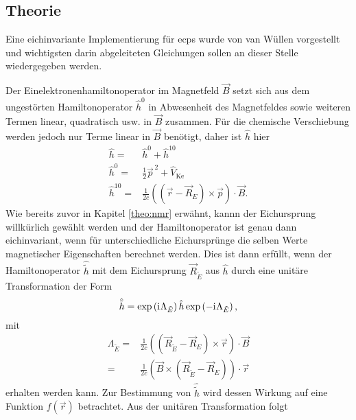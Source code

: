 	\subsection{Theorie}
	Eine eichinvariante Implementierung für \acp{ecp} wurde von van Wüllen\supercite{van2012use} vorgestellt und wichtigsten darin abgeleiteten Gleichungen sollen an dieser Stelle wiedergegeben werden. 
	
	Der Einelektronenhamiltonoperator im Magnetfeld $\vec{B}$ setzt sich aus dem ungestörten Hamiltonoperator $\hat{h}^0$ in Abwesenheit des Magnetfeldes sowie weiteren Termen linear, quadratisch usw. in $\vec{B}$ zusammen. Für die chemische Verschiebung werden jedoch nur Terme linear in $\vec{B}$ benötigt, daher ist $\hat{h}$ hier
	\begin{equation}\label{eq:heinel}
	\begin{aligned}
	\hat{h}=&\hat{h}^0+\hat{h}^{10}\\
	\hat{h}^0=&\frac{1}{2}\vec{p}^{\,2}+\hat{V}_{\textrm{Ke}}\\
	\hat{h}^{10}=&\frac{1}{2c}\left(\left(\vec{r}-\vec{R}_E\right)\times\vec{p}\right)\cdot\vec{B}.
	\end{aligned}
	\end{equation}
	Wie bereits zuvor in Kapitel \ref{theo:nmr} erwähnt, kannn der Eichursprung willkürlich gewählt werden und der Hamiltonoperator ist genau dann eichinvariant, wenn für unterschiedliche Eichursprünge die selben Werte magnetischer Eigenschaften berechnet werden. Dies ist dann erfüllt, wenn der Hamiltonoperator $\hat{\tilde{h}}$ mit dem Eichursprung $\vec{R}_{\tilde{E}}$ aus $\hat{h}$ durch eine unitäre Transformation der Form
	\begin{equation}\label{eq:trans}
	\hat{\tilde{h}}=\exp\left(\mathrm{i}\mkern1mu\Lambda_{\tilde{E}}\right)\hat{h}\exp\left(-\mathrm{i}\mkern1mu\Lambda_{\tilde{E}}\right),
	\end{equation}
	mit 
	\begin{equation}
	\begin{aligned}
	\Lambda_{\tilde{E}}=&\frac{1}{2c}\left(\left(\vec{R}_{\tilde{E}}-\vec{R}_E\right)\times\vec{r}\right)\cdot\vec{B}\\
	=&\frac{1}{2c}\left(\vec{B}\times\left(\vec{R}_{\tilde{E}}-\vec{R}_E\right)\right)\cdot\vec{r}
	\end{aligned}
	\end{equation}
	erhalten werden kann. Zur Bestimmung von $\hat{\tilde{h}}$ wird dessen Wirkung auf eine Funktion $f(\vec{r})$ betrachtet. Aus der unitären Transformation folgt
	
